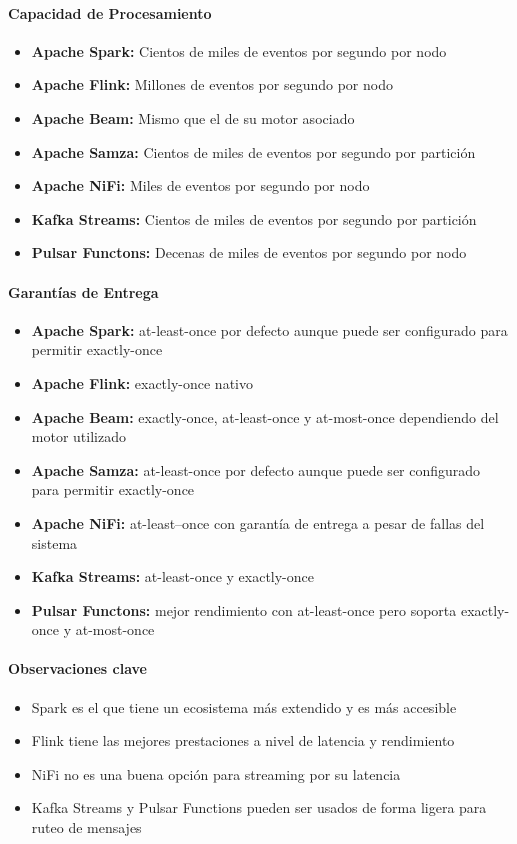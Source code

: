 \paragraph{Capacidad de Procesamiento}
\begin{itemize}
    \item \textbf{Apache Spark:} Cientos de miles de eventos por segundo por nodo
    \item \textbf{Apache Flink:} Millones de eventos por segundo por nodo
    \item \textbf{Apache Beam:} Mismo que el de su motor asociado 
    \item \textbf{Apache Samza:} Cientos de miles de eventos por segundo por partición
    \item \textbf{Apache NiFi:} Miles de eventos por segundo por nodo
    \item \textbf{Kafka Streams:} Cientos de miles de eventos por segundo por partición
    \item \textbf{Pulsar Functons:} Decenas de miles de eventos por segundo por nodo
\end{itemize}
\newpage
\paragraph{Garantías de Entrega}
\begin{itemize}
    \item \textbf{Apache Spark:} at-least-once por defecto aunque puede ser configurado para permitir exactly-once
    \item \textbf{Apache Flink:} exactly-once nativo
    \item \textbf{Apache Beam:} exactly-once, at-least-once y at-most-once dependiendo del motor utilizado
    \item \textbf{Apache Samza:} at-least-once por defecto aunque puede ser configurado para permitir exactly-once
    \item \textbf{Apache NiFi:} at-least--once con garantía de entrega a pesar de fallas del sistema
    \item \textbf{Kafka Streams:} at-least-once y exactly-once
    \item \textbf{Pulsar Functons:} mejor rendimiento con at-least-once pero soporta exactly-once y at-most-once
\end{itemize}

\paragraph{Observaciones clave}
\begin{itemize}
    \item Spark es el que tiene un ecosistema más extendido y es más accesible
    \item Flink tiene las mejores prestaciones a nivel de latencia y rendimiento
    \item NiFi no es una buena opción para streaming por su latencia 
    \item Kafka Streams y Pulsar Functions pueden ser usados de forma ligera para ruteo de mensajes
\end{itemize}

